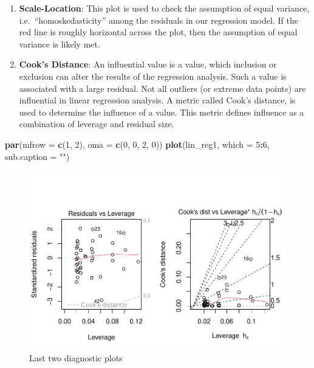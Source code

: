 \documentclass[
]{book}
\newenvironment{Shaded}{\begin{snugshade}}{\end{snugshade}}
\newcommand{\AttributeTok}[1]{\textcolor[rgb]{0.13,0.29,0.53}{#1}}
\newcommand{\DecValTok}[1]{\textcolor[rgb]{0.00,0.00,0.81}{#1}}
\newcommand{\FunctionTok}[1]{\textcolor[rgb]{0.13,0.29,0.53}{\textbf{#1}}}
\newcommand{\NormalTok}[1]{#1}
\newcommand{\SpecialCharTok}[1]{\textcolor[rgb]{0.81,0.36,0.00}{\textbf{#1}}}
\newcommand{\StringTok}[1]{\textcolor[rgb]{0.31,0.60,0.02}{#1}}
\providecommand{\tightlist}{%
  \setlength{\itemsep}{0pt}\setlength{\parskip}{0pt}}
\begin{document}
\begin{enumerate}
\def\labelenumi{\arabic{enumi}.}
\setcounter{enumi}{2}
\tightlist
\item
  \textbf{Scale-Location}: This plot is used to check the assumption of equal variance, i.e.~``homoskedasticity'' among the residuals in our regression model. If the red line is roughly horizontal across the plot, then the assumption of equal variance is likely met.
\item
  \textbf{Cook's Distance}: An influential value is a value, which inclusion or exclusion can alter the results of the regression analysis. Such a value is associated with a large residual. Not all outliers (or extreme data points) are influential in linear regression analysis. A metric called Cook's distance, is used to determine the influence of a value. This metric defines influence as a combination of leverage and residual size.
\end{enumerate}

\begin{Shaded}
\begin{Highlighting}[]
\FunctionTok{par}\NormalTok{(}\AttributeTok{mfrow =} \FunctionTok{c}\NormalTok{(}\DecValTok{1}\NormalTok{, }\DecValTok{2}\NormalTok{), }\AttributeTok{oma =} \FunctionTok{c}\NormalTok{(}\DecValTok{0}\NormalTok{, }\DecValTok{0}\NormalTok{, }\DecValTok{2}\NormalTok{, }\DecValTok{0}\NormalTok{))}
\FunctionTok{plot}\NormalTok{(lin\_reg1, }\AttributeTok{which =} \DecValTok{5}\SpecialCharTok{:}\DecValTok{6}\NormalTok{, }\AttributeTok{sub.caption =} \StringTok{""}\NormalTok{)}
\end{Highlighting}
\end{Shaded}

\begin{figure}

{\centering \includegraphics[height=0.4\textheight]{DauR_files/figure-latex/plots3-1} 

}

\caption{Last two diagnostic plots}\label{fig:plots3}
\end{figure}
\end{document}
